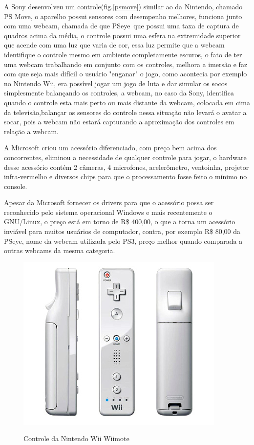 A Sony desenvolveu um controle(fig.\ref{psmove}) similar ao da Nintendo, chamado PS Move, o aparelho possui sensores com desempenho melhores, funciona junto com uma webcam,
chamada de que PSeye\, que
possui uma taxa de captura de quadros acima da média, o controle possui uma esfera na extremidade superior que acende com uma luz que varia de cor, essa luz
permite que a webcam identifique o controle mesmo em ambiente completamente escuros, o fato de ter uma webcam trabalhando em conjunto com os controles, melhora
a imersão e faz com que seja mais difícil o usuário "enganar" o jogo, como acontecia por exemplo no Nintendo Wii, era possível jogar um jogo de luta e dar simular
os socos simplesmente balançando os controles, a webcam, no caso da Sony, identifica quando o controle esta mais perto ou mais distante da webcam, colocada em
cima da televisão,balançar os sensores do controle nessa situação não levará o avatar a socar, pois a webcam não estará capturando a aproximação dos controles em
relação a webcam.\cite{MotionGamingReview}

A Microsoft criou um acessório diferenciado, com preço bem acima dos concorrentes, eliminou a necessidade de qualquer controle para jogar, o hardware desse
acessório contém 2 câmeras, 4 microfones, acelerômetro, ventoinha, projetor infra-vermelho e diversos chips para que o processamento fosse feito o mínimo no
console.\cite{InsideKinect}

Apesar da Microsoft fornecer os drivers para que o acessório possa ser reconhecido pelo sistema operacional Windows e mais recentemente o GNU/Linux, o preço está
em torno de R\$ 400,00, o que a torna um acessório inviável para muitos usuários de computador,  contra, por exemplo R\$ 80,00 da PSeye, nome da webcam
utilizada pelo PS3, preço melhor quando comparada a outras webcams da mesma categoria.

\begin{figure}[h]
    \center
    \includegraphics[scale=0.45]{imagens/wiimote.jpg}
    \label{wiimote}
    \caption{Controle da Nintendo Wii Wiimote}
\end{figure}

